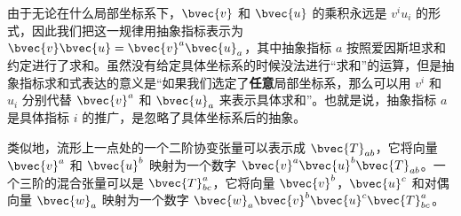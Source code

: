 由于无论在什么局部坐标系下，$\bvec{v}$ 和 $\bvec{u}$ 的乘积永远是 $v^iu_i$ 的形式，因此我们把这一规律用抽象指标表示为 $\bvec{v}\bvec{u}=\bvec{v}^a\bvec{u}_a$，其中抽象指标 $a$ 按照爱因斯坦求和约定进行了求和。虽然没有给定具体坐标系的时候没法进行“求和”的运算，但是抽象指标求和式表达的意义是“如果我们选定了\textbf{任意}局部坐标系，那么可以用 $v^i$ 和 $u_i$ 分别代替 $\bvec{v}^a$ 和 $\bvec{u}_a$ 来表示具体求和”。也就是说，抽象指标 $a$ 是具体指标 $i$ 的推广，是忽略了具体坐标系后的抽象。

类似地，流形上一点处的一个二阶协变张量可以表示成 $\bvec{T}_{ab}$，它将向量 $\bvec{v}^a$ 和 $\bvec{u}^b$ 映射为一个数字 $\bvec{v}^a\bvec{u}^b\bvec{T}_{ab}$。一个三阶的混合张量可以是 $\bvec{T}^a_{bc}$，它将向量 $\bvec{v}^b$，$\bvec{u}^c$ 和对偶向量 $\bvec{w}_a$ 映射为一个数字 $\bvec{w}_a\bvec{v}^b\bvec{u}^c\bvec{T}_{bc}^a$。





